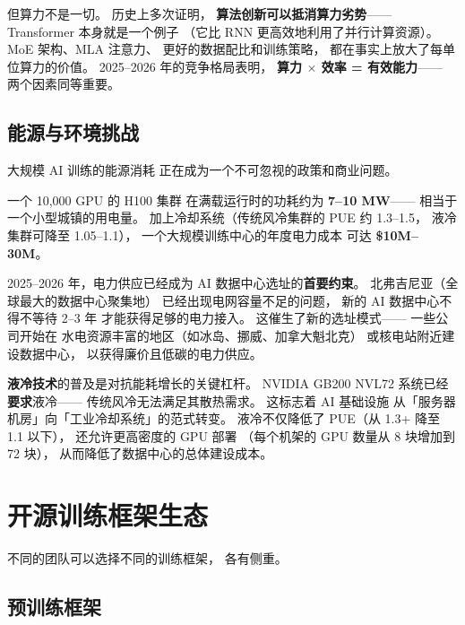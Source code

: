 但算力不是一切。
历史上多次证明，
\textbf{算法创新可以抵消算力劣势}——
Transformer 本身就是一个例子
（它比 RNN 更高效地利用了并行计算资源）。
MoE 架构、MLA 注意力、
更好的数据配比和训练策略，
都在事实上放大了每单位算力的价值。
2025--2026 年的竞争格局表明，
\textbf{算力 $\times$ 效率 = 有效能力}——
两个因素同等重要。

\subsection{能源与环境挑战}

大规模 AI 训练的能源消耗
正在成为一个不可忽视的政策和商业问题。

一个 10,000 GPU 的 H100 集群
在满载运行时的功耗约为 \textbf{7--10 MW}——
相当于一个小型城镇的用电量。
加上冷却系统（传统风冷集群的 PUE 约 1.3--1.5，
液冷集群可降至 1.05--1.1），
一个大规模训练中心的年度电力成本
可达 \textbf{\$10M--30M}。

2025--2026 年，电力供应已经成为
AI 数据中心选址的\textbf{首要约束}。
北弗吉尼亚（全球最大的数据中心聚集地）
已经出现电网容量不足的问题，
新的 AI 数据中心不得不等待 2--3 年
才能获得足够的电力接入。
这催生了新的选址模式——
一些公司开始在
水电资源丰富的地区（如冰岛、挪威、加拿大魁北克）
或核电站附近建设数据中心，
以获得廉价且低碳的电力供应。

\textbf{液冷技术}的普及是对抗能耗增长的关键杠杆。
NVIDIA GB200 NVL72 系统已经\textbf{要求}液冷——
传统风冷无法满足其散热需求。
这标志着 AI 基础设施
从「服务器机房」向「工业冷却系统」的范式转变。
液冷不仅降低了 PUE（从 1.3+ 降至 1.1 以下），
还允许更高密度的 GPU 部署
（每个机架的 GPU 数量从 8 块增加到 72 块），
从而降低了数据中心的总体建设成本。

\section{开源训练框架生态}

不同的团队可以选择不同的训练框架，
各有侧重。

\subsection{预训练框架}

